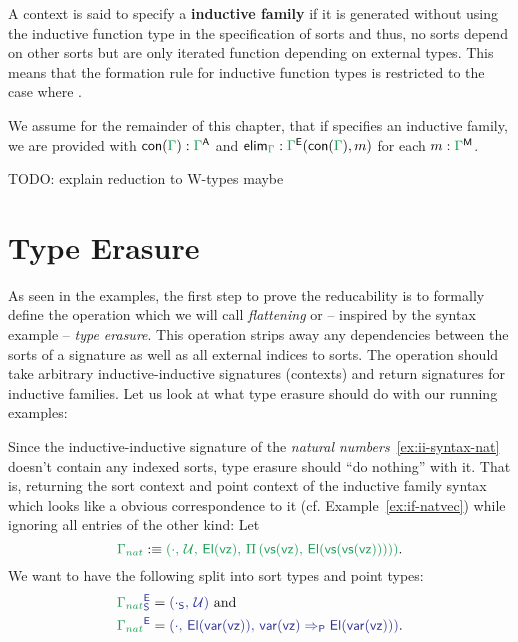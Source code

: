 \begin{defn}
A context \grm{\Gamma} is said to specify a \textbf{inductive family} if it is
generated without using the inductive function type in the specification of sorts
and thus, no sorts depend on other sorts but are only iterated function depending
on external types.
This means that the formation rule for inductive function types is restricted
to the case where .
\end{defn}

We assume for the remainder of this chapter, that if \grm{\Gamma} specifies an
inductive family, we are provided with $\con{\Gamma} : \grm{\Gamma}^\CC$ and
$\elim_\grm{\Gamma} : \grm{\Gamma}^\EE(\con{\Gamma}, m)$ for each
$m : \grm{\Gamma}^\MM$.

TODO: explain reduction to W-types maybe

\section{Type Erasure}

As seen in the examples, the first step to prove the reducability is to formally
define the operation which we will call \emph{flattening} or -- inspired by
the syntax example -- \emph{type erasure}.
This operation strips away any dependencies between the sorts of a signature
as well as all external indices to sorts.
The operation should take arbitrary inductive-inductive signatures (contexts) and
return signatures for inductive families.
Let us look at what type erasure should do with our running examples:

\begin{example}\label{ex:red-e-nat}
Since the inductive-inductive signature of the \emph{natural numbers}~\ref{ex:ii-syntax-nat} doesn't
contain any indexed sorts, type erasure should ``do nothing'' with it.
That is, returning the sort context and point context of the inductive family
syntax which looks like a obvious correspondence to it (cf. Example~\ref{ex:if-natvec})
while ignoring all entries of the other kind:
Let
\begin{equation*}
\grm{\Gamma_{nat}} 
  :\equiv \grm{(\cdot,\, \UU,\, \El(\vz),\, \Pi\left(\vs(\vz),\, \El(\vs(\vs(\vz)))\right))}
  \text{.}
\end{equation*}
We want to have the following split into sort types and point types:
\begin{align*}
\tqm{\grm{\Gamma_{nat}}^\EE_\Sc}
 &= \tqm{(\cdot_\Sc,\, \UU)} \text{ and} \\
\tqm{\grm{\Gamma_{nat}}^\EE}
 &= \tqm{(\cdot,\, \El(\var(\vz)),\, \var(\vz) \Rightarrow_\Pc \El(\var(\vz)))} \text{.}
\end{align*}
\end{example}

